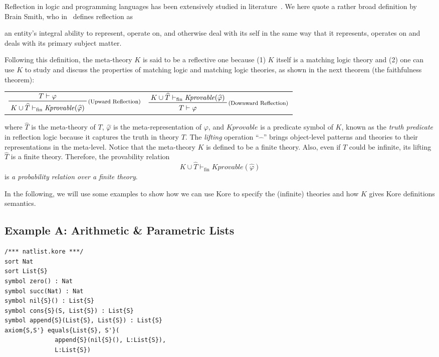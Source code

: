\documentclass[UTF8,11pt]{article}
\theoremstyle{plain}
\theoremstyle{definition}
\theoremstyle{remark}
\newcommand{\vdashfin}{\vdash_\text{fin}}
\newcommand{\Kdeduce}{\mathit{Kprovable}}
\begin{document}
Reflection in logic and programming languages has been extensively studied 
in literature~\cite{?}.
We here quote a rather broad definition by Brain Smith, who in~\cite{?} defines 
reflection as
\begin{displayquote}
	an entity’s integral ability to represent, operate on,
	and otherwise deal with its self in the same way that
	it represents, operates on and deals with its primary
	subject matter.
\end{displayquote}
Following this definition, the meta-theory $K$ is said to be a {reflective} one 
because 
(1) $K$ itself is a matching logic theory and 
(2) one can use $K$ to study and discuss the properties of matching logic and 
matching logic theories, as shown in the next theorem (the faithfulness 
theorem):
\begin{center}
	\begin{tabular}{cc}
		$
		\prftree[r]{\footnotesize (Upward Reflection)}
		{T \vdash \varphi}
		{K \cup \widehat{T} \vdashfin \Kdeduce(\widehat{\varphi})}
		$
		&
		$
		\prftree[r]{\footnotesize (Downward Reflection)}
		{K \cup \widehat{T} \vdashfin \Kdeduce(\widehat{\varphi})}
		{T \vdash \varphi}
		$
	\end{tabular}
\end{center}
where $\widehat{T}$ is the meta-theory of $T$, $\widehat{\varphi}$ is the 
meta-representation of $\varphi$, and $\Kdeduce$ is a predicate symbol of $K$, 
known as the \emph{truth predicate} in reflection logic because it captures the 
truth in theory $T$. The \emph{lifting} operation ``$\widehat{\ \ \ }$'' brings 
object-level patterns and theories to their 
representations in the meta-level.
Notice that the meta-theory $K$ is defined to be a finite theory. Also, even if 
$T$ could be infinite, its lifting $\widehat{T}$ is a finite theory.
Therefore, the provability relation
$$
K \cup \widehat{T} \vdashfin \Kdeduce(\widehat{\varphi})
$$
is \emph{a probability relation over a finite theory}.

In the following, we will use some examples to show how we can use 
Kore to specify the (infinite) theories and how $K$ gives Kore definitions 
semantics.

\subsection{Example A: Arithmetic \& Parametric Lists}

\begin{lstlisting}[language=kore]
/*** natlist.kore ***/
sort Nat
sort List{S}
symbol zero() : Nat
symbol succ(Nat) : Nat
symbol nil{S}() : List{S}
symbol cons{S}(S, List{S}) : List{S}
symbol append{S}(List{S}, List{S}) : List{S}
axiom{S,S'} equals{List{S}, S'}(
              append{S}(nil{S}(), L:List{S}),
              L:List{S})
\end{lstlisting}
\end{document}
